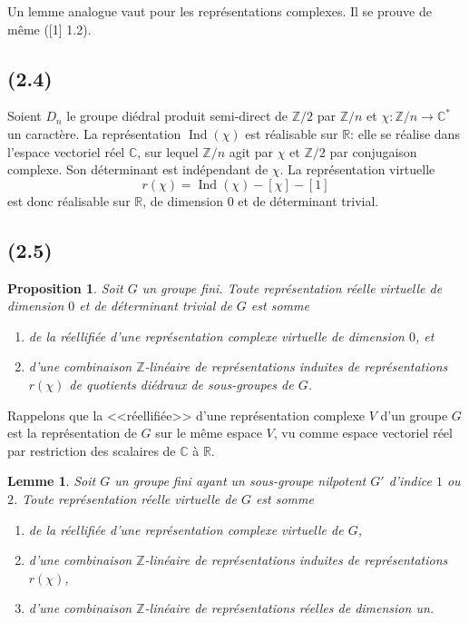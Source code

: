 \documentclass[11pt]{amsart}
\theoremstyle{plain}
\newtheorem{proposition}[theoreme]{Proposition}
\newtheorem{lemme}[theoreme]{Lemme}
\theoremstyle{definition}
\DeclareMathOperator{\Ind}{Ind}
\newcommand{\C}{\mathbb{C}}
\newcommand{\R}{\mathbb{R}}
\newcommand{\Z}{\mathbb{Z}}
\begin{document}
Un lemme analogue vaut pour les repr\'esentations complexes. Il se prouve de m\^eme ([1] 1.2).

\subsection{(2.4)}
Soient $D_n$ le groupe di\'edral produit semi-direct de $\Z/2$ par $\Z/n$ et $\chi\colon\Z/n\to\C^*$ un caract\`ere. La repr\'esentation $\Ind(\chi)$ est r\'ealisable sur $\R$: elle se r\'ealise dans l'espace vectoriel r\'eel $\C$, sur lequel $\Z/n$ agit par $\chi$ et $\Z/2$ par conjugaison complexe. Son d\'eterminant est ind\'ependant de $\chi$. La repr\'esentation virtuelle
\[
r(\chi)=\Ind(\chi)-[\chi]-[1]
\]
est donc r\'ealisable sur $\R$, de dimension $0$ et de d\'eterminant trivial.

\subsection{(2.5)}
\begin{proposition}\label{prop:2.5}
Soit $G$ un groupe fini. Toute repr\'esentation r\'eelle virtuelle de dimension $0$ et de d\'eterminant trivial de $G$ est somme
\begin{enumerate}
\item[(a)] de la r\'eellifi\'ee d'une repr\'esentation complexe virtuelle de dimension $0$, et
\item[(b)] d'une combinaison $\Z$-lin\'eaire de repr\'esentations induites de repr\'esentations $r(\chi)$ de quotients di\'edraux de sous-groupes de $G$.
\end{enumerate}
\end{proposition}

Rappelons que la <<r\'eellifi\'ee>> d'une repr\'esentation complexe $V$ d'un groupe $G$ est la repr\'esentation de $G$ sur le m\^eme espace $V$, vu comme espace vectoriel r\'eel par restriction des scalaires de $\C$ \`a $\R$.

\begin{lemme}\label{lem:2.6}
Soit $G$ un groupe fini ayant un sous-groupe nilpotent $G'$ d'indice $1$ ou $2$. Toute repr\'esentation r\'eelle virtuelle de $G$ est somme
\begin{enumerate}
\item[(a)] de la r\'eellifi\'ee d'une repr\'esentation complexe virtuelle de $G$,
\item[(b)] d'une combinaison $\Z$-lin\'eaire de repr\'esentations induites de repr\'esentations $r(\chi)$,
\item[(c)] d'une combinaison $\Z$-lin\'eaire de repr\'esentations r\'eelles de dimension un.
\end{enumerate}
\end{lemme}
\end{document}
